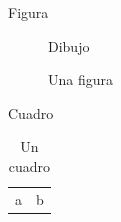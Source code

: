 \documentclass{beamer}
\begin{document}
\begin{frame}{Figura}
\begin{figure}
Dibujo
\caption{Una figura}
\end{figure}
\end{frame}
\begin{frame}{Cuadro}
\begin{table}
\begin{tabular}{ll}a&b\end{tabular}
\caption{Un cuadro}
\end{table}
\end{frame}
\end{document}
